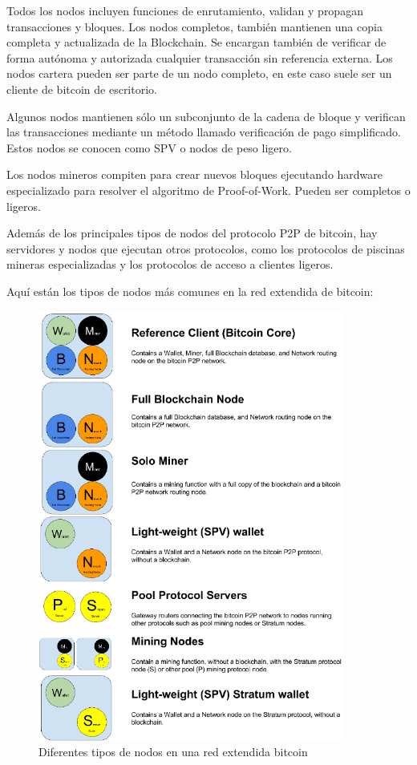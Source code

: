 \noindent Todos los nodos incluyen funciones de enrutamiento, validan y propagan transacciones y bloques. Los nodos 
completos, también mantienen una copia completa y actualizada de la Blockchain. Se encargan también de verificar de 
forma autónoma y autorizada cualquier transacción sin referencia externa. Los nodos cartera pueden ser parte de un
nodo completo, en este caso suele ser un cliente de bitcoin de escritorio.

\vspace{5mm}

\noindent Algunos nodos mantienen sólo un subconjunto de la cadena de bloque y verifican las transacciones mediante un 
método llamado verificación de pago simplificado. Estos nodos se conocen como SPV o nodos de peso ligero.

\vspace{5mm}

\noindent Los nodos mineros compiten para crear nuevos bloques ejecutando hardware especializado para resolver el 
algoritmo de Proof-of-Work. Pueden ser completos o ligeros.

\vspace{5mm}

\noindent Además de los principales tipos de nodos del protocolo P2P de bitcoin, hay servidores y nodos que ejecutan 
otros protocolos, como los protocolos de piscinas mineras especializadas y los protocolos de acceso a clientes ligeros. 

\newpage

\noindent Aquí están los tipos de nodos más comunes en la red extendida de bitcoin:

\begin{figure}[ht!]
    \centering
    \includegraphics[width=10cm]{imagenes/introduccion/diferentes_nodos_red_extendida}
    \caption{Diferentes tipos de nodos en una red extendida bitcoin}
\end{figure}

